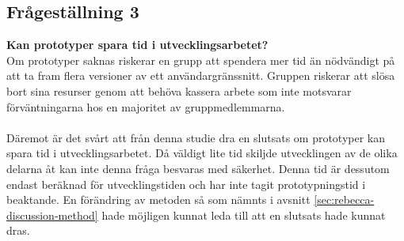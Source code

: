 \subsection{Frågeställning 3}
\textbf{Kan prototyper spara tid i utvecklingsarbetet?}
\\
Om prototyper saknas riskerar en grupp att spendera mer tid än nödvändigt på att ta fram flera versioner av ett användargränssnitt. Gruppen riskerar att slösa bort sina resurser genom att behöva kassera arbete som inte motsvarar förväntningarna hos en majoritet av gruppmedlemmarna.
\\ \\
Däremot är det svårt att från denna studie dra en slutsats om prototyper kan spara tid i utvecklingsarbetet. Då väldigt lite tid skiljde utvecklingen av de olika delarna åt kan inte denna fråga besvaras med säkerhet. Denna tid är dessutom endast beräknad för utvecklingstiden och har inte tagit prototypningstid i beaktande. En förändring av metoden så som nämnts i avsnitt \ref{sec:rebecca-discussion-method} hade möjligen kunnat leda till att en slutsats hade kunnat dras. 
